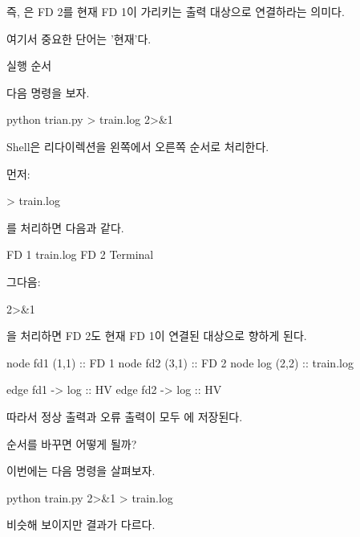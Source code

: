 즉, 은 FD 2를 현재 FD 1이 가리키는 출력 대상으로 연결하라는 의미다.

여기서 중요한 단어는 '현재'다.

\begin{dhknote}
\begin{dhksmry}[centered]
실행 순서
\end{dhksmry}
\end{dhknote}

다음 명령을 보자.

\begin{dhkzsh}
python trian.py > train.log 2>&1
\end{dhkzsh}

Shell은 리다이렉션을 왼쪽에서 오른쪽 순서로 처리한다.

먼저:

\begin{dhkzsh}
> train.log
\end{dhkzsh}

를 처리하면 다음과 같다.

\begin{dhksmry}
FD 1 \ra train.log
FD 2 \ra Terminal
\end{dhksmry}

그다음:

\begin{dhkzsh}
2>&1
\end{dhkzsh}

을 처리하면 FD 2도 현재 FD 1이 연결된 대상으로 향하게 된다.

\begin{dhkdiagram}
node fd1 (1,1) :: FD 1
node fd2 (3,1) :: FD 2
node log (2,2) :: train.log

edge fd1 -> log :: HV
edge fd2 -> log :: HV
\end{dhkdiagram}

따라서 정상 출력과 오류 출력이 모두 에 저장된다.

\begin{dhknote}
\begin{dhksmry}[centered]
순서를 바꾸면 어떻게 될까?
\end{dhksmry}
\end{dhknote}

이번에는 다음 명령을 살펴보자.

\begin{dhkzsh}
python train.py 2>&1 > train.log
\end{dhkzsh}

비슷해 보이지만 결과가 다르다.

